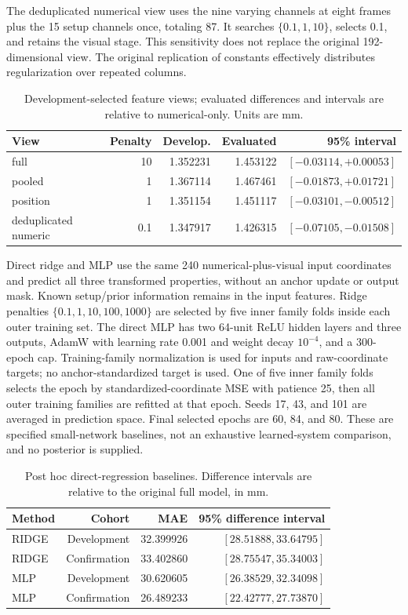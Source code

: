 The deduplicated numerical view uses the nine varying channels at eight frames plus the 15 setup channels once, totaling 87. It searches $\{0.1,1,10\}$, selects 0.1, and retains the visual stage. This sensitivity does not replace the original 192-dimensional view. The original replication of constants effectively distributes regularization over repeated columns.
\begin{table}[htbp]\centering\small
\caption{Development-selected feature views; evaluated differences and intervals are relative to numerical-only. Units are mm.}\label{tab:ext_channels}
\begin{tabular}{lrrrr}\toprule
View & Penalty & Develop. & Evaluated & 95\% interval\\\midrule
full & 10 & 1.352231 & 1.453122 & $[-0.03114,+0.00053]$\\
pooled & 1 & 1.367114 & 1.467461 & $[-0.01873,+0.01721]$\\
position & 1 & 1.351154 & 1.451117 & $[-0.03101,-0.00512]$\\
deduplicated numeric & 0.1 & 1.347917 & 1.426315 & $[-0.07105,-0.01508]$\\
\bottomrule\end{tabular}
\end{table}
Direct ridge and MLP use the same 240 numerical-plus-visual input coordinates and predict all three transformed properties, without an anchor update or output mask. Known setup/prior information remains in the input features. Ridge penalties $\{0.1,1,10,100,1000\}$ are selected by five inner family folds inside each outer training set. The direct MLP has two 64-unit ReLU hidden layers and three outputs, AdamW with learning rate 0.001 and weight decay $10^{-4}$, and a 300-epoch cap. Training-family normalization is used for inputs and raw-coordinate targets; no anchor-standardized target is used. One of five inner family folds selects the epoch by standardized-coordinate MSE with patience 25, then all outer training families are refitted at that epoch. Seeds 17, 43, and 101 are averaged in prediction space. Final selected epochs are 60, 84, and 80. These are specified small-network baselines, not an exhaustive learned-system comparison, and no posterior is supplied.
\begin{table}[htbp]\centering\small
\caption{Post hoc direct-regression baselines. Difference intervals are relative to the original full model, in mm.}\label{tab:ext_direct}
\begin{tabular}{lrrr}\toprule
Method & Cohort & MAE & 95\% difference interval\\\midrule
RIDGE & Development & 32.399926 & $[28.51888,33.64795]$\\
RIDGE & Confirmation & 33.402860 & $[28.75547,35.34003]$\\
MLP & Development & 30.620605 & $[26.38529,32.34098]$\\
MLP & Confirmation & 26.489233 & $[22.42777,27.73870]$\\
\bottomrule\end{tabular}
\end{table}
